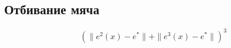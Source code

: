 \documentclass[../../doc.tex]{subfiles}
\begin{document}
    \subsection{Отбивание мяча}
    
    \begin{equation*}
        \left(\|e^2(x) - e^* \| + \|e^3(x) - e^*\|\right)^3
    \end{equation*}

    \ifSubfilesClassLoaded{
        \nocite{*}
        \clearpage
        
        
    }{}
\end{document}
